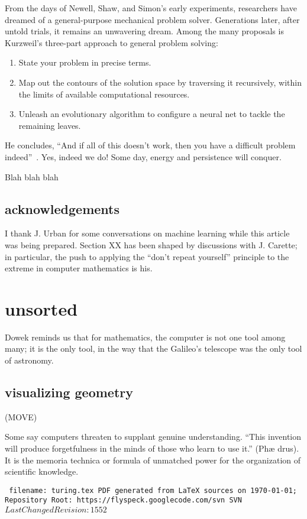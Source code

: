 \documentclass{llncs}
\def\svninfo{{\tt
  filename: turing.tex\hfill\break
  PDF generated from LaTeX sources on \today; \hfill\break
  Repository Root: https://flyspeck.googlecode.com/svn \hfill\break
  SVN $LastChangedRevision: 1552 $
  }
  }
\begin{document}
From the days of Newell, Shaw, and Simon's early experiments, researchers
have dreamed of a general-purpose mechanical problem solver.  Generations later,
after untold trials, it remains an unwavering dream.  Among the many
proposals is Kurzweil's three-part approach to general problem solving:
\begin{enumerate} 
\item State your problem in precise terms.
\item Map out the contours of the solution space by traversing it
  recursively, within the limits of available computational resources.
\item Unleash an evolutionary algorithm to configure a neural net to
  tackle the remaining leaves.
\end{enumerate}
He concludes, ``And if all of this doesn't work, then you have a
difficult problem indeed''~\cite{Ku99}.  Yes, indeed we do!  Some day,
energy and persistence will conquer.

\bigskip
Blah blah blah




\subsection{acknowledgements}

I thank J. Urban for some conversations on machine learning while this
article was being prepared. Section XX has been shaped by
discussions with J. Carette; in particular, the push to applying the
``don't repeat yourself'' principle to the extreme in computer mathematics is
his.


\section{unsorted}

Dowek reminds us that for mathematics, the computer is not one tool among
many; it is the only tool, in the way that the Galileo's telescope was the only
tool of astronomy.

\subsection{visualizing geometry}

(MOVE)

Some say computers threaten to supplant genuine
understanding.  ``This invention will produce
forgetfulness in the minds of those who learn to use it.'' (Ph\ae
drus).  
It is the memoria technica or formula of unmatched power for the
organization of scientific knowledge.



\raggedright



\bigskip
\noindent
\svninfo
\end{document}
